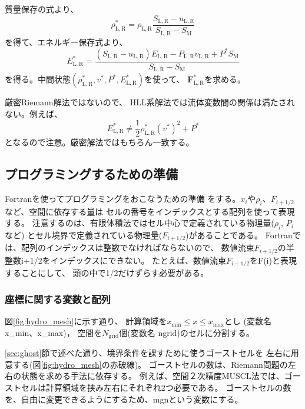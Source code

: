 質量保存の式より、
\begin{equation}
     \rho_\mathrm{L,R}^* = \rho_\mathrm{L,R} 
     \frac{S_\mathrm{L,R} - u_\mathrm{L,R}}{ S_\mathrm{L,R} - S_\mathrm{M}}
\end{equation}
を得て、エネルギー保存式より、
\begin{equation}
  E_\mathrm{L,R}^* = \frac{ \left(S_\mathrm{L,R} - u_\mathrm{L,R}\right) E_\mathrm{L,R}
  - P_\mathrm{L,R}v_\mathrm{L,R} + P^* S_\mathrm{M}
  }{ S_\mathrm{L,R} - S_\mathrm{M}}
\end{equation}
を得る。中間状態$(\rho_\mathrm{L,R}^*,v^*, P^*, E_\mathrm{L,R}^*)$を使って、
$\bm{ F}_\mathrm{L,R}^*$を求める。

厳密Riemann解法ではないので、
HLL系解法では流体変数間の関係は満たされない。例えば、
\begin{equation}
    E_\mathrm{L,R}^* \ne \frac{1}{2}\rho_\mathrm{L,R}^* (v^*)^2 + P^*
\end{equation}
となるので注意。厳密解法ではもちろん一致する。






\clearpage
\subsection{プログラミングするための準備}
Fortranを使ってプログラミングをおこなうための準備
をする。$x_i$や$\rho_i$、$F_{i+1/2}$など、空間に依存する量は
セルの番号をインデックスとする配列を使って表現する。
注意するのは、有限体積法ではセル中心で定義されている物理量($\rho_i$, $P_i$など)
とセル境界で定義されている物理量($F_{i+1/2}$)があることである。
Fortranでは、配列のインデックスは整数でなければならないので、
数値流束$F_{i+1/2}$の半整数{\ttfamily i+1/2}をインデックスにできない。
たとえば、数値流束$F_{i+1/2}$を{\ttfamily F(i)}と表現することにして、
頭の中で1/2だけずらす必要がある。

\subsubsection{座標に関する変数と配列}

図\ref{fig:hydro_mesh}に示す通り、
計算領域を$x_\mathrm{min}\le x\le x_\mathrm{max}$とし
(変数名 {\ttfamily x\_min}、{\ttfamily x\_max})，
空間を$N_\mathrm{grid}$個(変数名 {\ttfamily ngrid})のセルに分割する。

\ref{sec:ghost}節で述べた通り、境界条件を課すために使うゴーストセルを
左右に用意する(図\ref{fig:hydro_mesh}の赤破線)。
ゴーストセルの数は、Riemann問題の左右の状態を求める手法に依存する。
例えば、空間２次精度MUSCL法では、ゴーストセルは計算領域を挟み左右にそれぞれ2つ必要である。
ゴーストセルの数を、自由に変更できるようにするため、{\ttfamily mgn}という変数にする。

